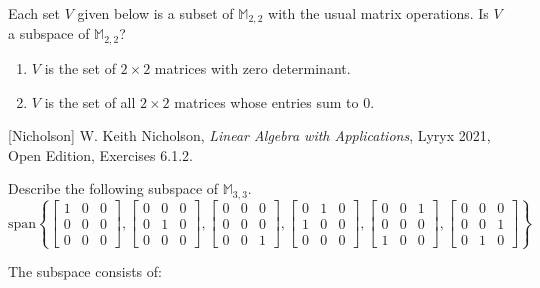 \documentclass{ximera}
\begin{document}
 \begin{exercise}
 Each set $V$ given below is a subset of $\mathbb{M}_{2,2}$ with the usual matrix operations.  Is $V$ a subspace of $\mathbb{M}_{2,2}$?
\begin{enumerate}
 \item $V$ is the set of $2 \times 2$ matrices with zero determinant.
\begin{multipleChoice}
 \end{multipleChoice}

 \item $V$ is the set of all $2 \times 2$ matrices whose entries sum to 0.

 \begin{multipleChoice}
 \end{multipleChoice}
 
\end{enumerate}
[Nicholson] W. Keith Nicholson, {\it Linear Algebra with Applications}, Lyryx 2021, Open Edition, Exercises 6.1.2. 
 \end{exercise}

\begin{exercise}
Describe the following subspace of $\mathbb{M}_{3,3}$.
$$\text{span}\left\{\begin{bmatrix}1 & 0 & 0\\0 & 0 & 0\\0 & 0 & 0\end{bmatrix},\begin{bmatrix}0 & 0 & 0\\0 & 1 & 0\\0 & 0 & 0\end{bmatrix}, \begin{bmatrix}0 & 0 & 0\\0 & 0 & 0\\0 & 0 & 1\end{bmatrix}, \begin{bmatrix}0 & 1 & 0\\1 & 0 & 0\\0 & 0 & 0\end{bmatrix}, \begin{bmatrix}0 & 0 & 1\\0 & 0 & 0\\1 & 0 & 0\end{bmatrix}, \begin{bmatrix}0 & 0 & 0\\0 & 0 & 1\\0 & 1 & 0\end{bmatrix}\right\}$$

The subspace consists of:
 \begin{multipleChoice}
 \end{multipleChoice}

 \end{exercise}
\end{document}
